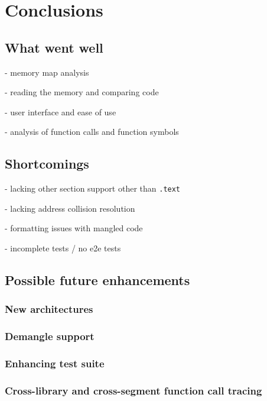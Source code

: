 \chapter{Conclusions}
\label{cha:conlusions}

\section{What went well}

- memory map analysis

- reading the memory and comparing code

- user interface and ease of use

- analysis of function calls and function symbols

\section{Shortcomings}

- lacking other section support other than \verb|.text|

- lacking address collision resolution

- formatting issues with mangled code

- incomplete tests / no e2e tests

\section{Possible future enhancements}

\subsection{New architectures}

\subsection{Demangle support}

\subsection{Enhancing test suite}

\subsection{Cross-library and cross-segment function call tracing}